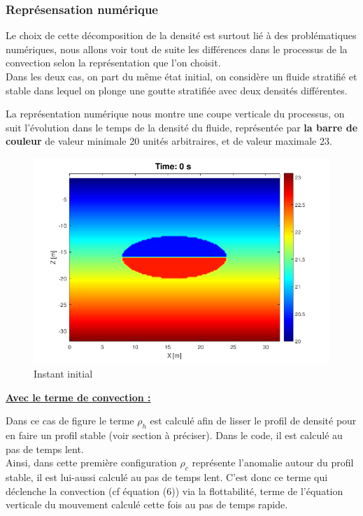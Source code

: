 \documentclass{rapportECC}
\begin{document}
\subsubsection{Représensation numérique}

Le choix de cette décomposition de la densité est surtout lié à  des problématiques numériques, nous allons voir tout de suite les différences dans le processus de la convection selon la représentation que l'on choisit. \\
Dans les deux cas, on part du même état initial, on considère un fluide stratifié et stable dans lequel on plonge une goutte stratifiée avec deux densités différentes.

La représentation numérique nous montre une coupe verticale du processus, on suit l'évolution dans le temps de la densité du fluide, représentée par \textbf{la barre de couleur} de valeur minimale 20 unités arbitraires, et de valeur maximale 23. 

\begin{figure}[H]
    \centering
    \includegraphics[width=0.7
    \textwidth]{images/Int_ConvT0.png}
    \caption{Instant initial}
\end{figure}


\vspace{1 cm}
\underline{\textbf{Avec le terme de convection :}}
\vspace{0.5 cm}

Dans ce cas de figure le terme $\rho_h$ est calculé afin de  lisser le profil de densité pour en faire un profil stable (voir section à préciser). Dans le code, il est calculé au pas de temps lent. \\
Ainsi, dans cette première configuration $\rho_c$ représente l'anomalie autour du profil stable, il est lui-aussi calculé au pas de temps lent. C'est donc ce terme qui déclenche la convection (cf équation (6)) via la flottabilité, terme de l'équation verticale du mouvement calculé cette fois au pas de temps rapide. \\
\end{document}
